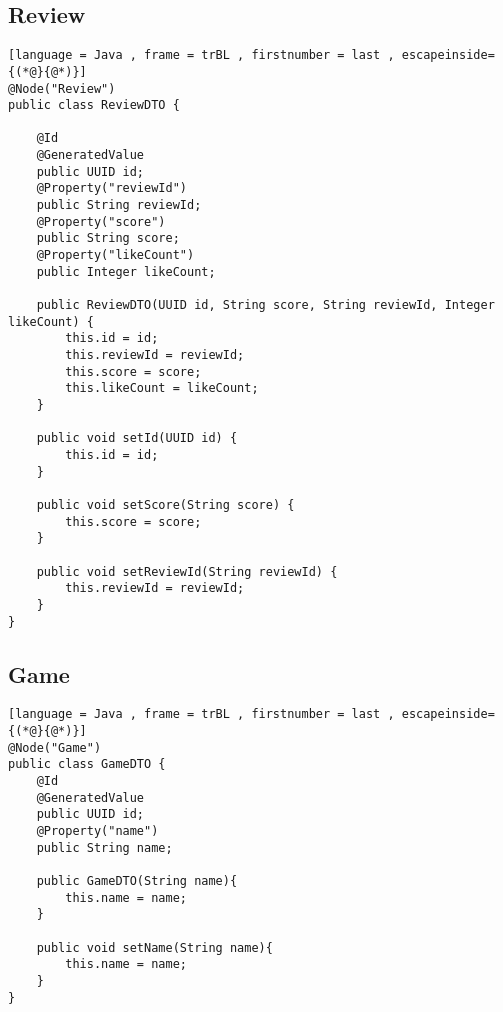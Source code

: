 \subsection{Review}
\begin{lstlisting}[language = Java , frame = trBL , firstnumber = last , escapeinside={(*@}{@*)}]
@Node("Review")
public class ReviewDTO {

    @Id
    @GeneratedValue
    public UUID id;
    @Property("reviewId")
    public String reviewId;
    @Property("score")
    public String score;
    @Property("likeCount")
    public Integer likeCount;

    public ReviewDTO(UUID id, String score, String reviewId, Integer likeCount) {
        this.id = id;
        this.reviewId = reviewId;
        this.score = score;
        this.likeCount = likeCount;
    }

    public void setId(UUID id) {
        this.id = id;
    }

    public void setScore(String score) {
        this.score = score;
    }

    public void setReviewId(String reviewId) {
        this.reviewId = reviewId;
    }
}
\end{lstlisting}
\subsection{Game}
\begin{lstlisting}[language = Java , frame = trBL , firstnumber = last , escapeinside={(*@}{@*)}]
@Node("Game")
public class GameDTO {
    @Id
    @GeneratedValue
    public UUID id;
    @Property("name")
    public String name;

    public GameDTO(String name){
        this.name = name;
    }

    public void setName(String name){
        this.name = name;
    }
}
\end{lstlisting}